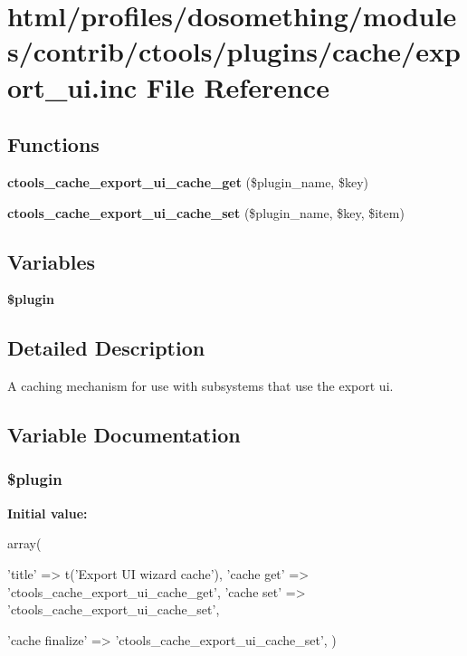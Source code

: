 \hypertarget{export__ui_8inc}{
\section{html/profiles/dosomething/modules/contrib/ctools/plugins/cache/export\_\-ui.inc File Reference}
\label{export__ui_8inc}
}
\subsection*{Functions}
\begin{DoxyCompactItemize}
\item 
\hypertarget{export__ui_8inc_abc6ec973c8a5c499a8b3c294ae76a44a}{
{\bfseries ctools\_\-cache\_\-export\_\-ui\_\-cache\_\-get} (\$plugin\_\-name, \$key)}
\label{export__ui_8inc_abc6ec973c8a5c499a8b3c294ae76a44a}

\item 
\hypertarget{export__ui_8inc_a471b7221c9c22a945dfb2d4f274c5ae5}{
{\bfseries ctools\_\-cache\_\-export\_\-ui\_\-cache\_\-set} (\$plugin\_\-name, \$key, \$item)}
\label{export__ui_8inc_a471b7221c9c22a945dfb2d4f274c5ae5}

\end{DoxyCompactItemize}
\subsection*{Variables}
\begin{DoxyCompactItemize}
\item 
{\bfseries \$plugin}
\end{DoxyCompactItemize}


\subsection{Detailed Description}
A caching mechanism for use with subsystems that use the export ui. 

\subsection{Variable Documentation}
\hypertarget{export__ui_8inc_ada8a7130088351710bb02ed622d6bf65}{
\subsubsection[{\$plugin}]{\setlength{\rightskip}{0pt plus 5cm}\$plugin}}
\label{export__ui_8inc_ada8a7130088351710bb02ed622d6bf65}
{\bfseries Initial value:}
\begin{DoxyCode}
 array(
  
  
  'title' => t('Export UI wizard cache'),
  'cache get' => 'ctools_cache_export_ui_cache_get',
  'cache set' => 'ctools_cache_export_ui_cache_set',
  
  
  'cache finalize' => 'ctools_cache_export_ui_cache_set',
)
\end{DoxyCode}
